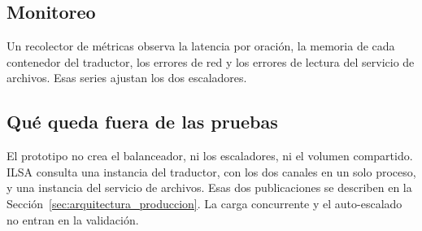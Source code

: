 \subsection{Monitoreo}
Un recolector de métricas observa la latencia por oración, la memoria de cada contenedor del traductor, los errores de red y los errores de lectura del servicio de archivos. Esas series ajustan los dos escaladores.

\subsection{Qué queda fuera de las pruebas}
El prototipo no crea el balanceador, ni los escaladores, ni el volumen compartido. ILSA consulta una instancia del traductor, con los dos canales en un solo proceso, y una instancia del servicio de archivos. Esas dos publicaciones se describen en la Sección~\ref{sec:arquitectura_produccion}. La carga concurrente y el auto-escalado no entran en la validación.
